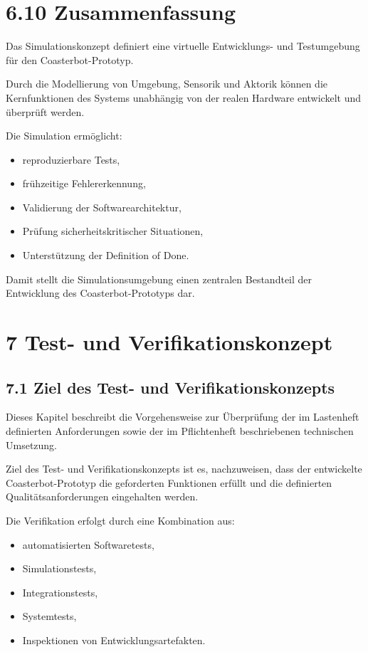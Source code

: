 \documentclass[
  a4paper,
  12pt,
  DIV=12,        %
  parskip=half,  %
  headings=small %
]{scrartcl}
\theoremstyle{definition}
\providecommand{\tightlist}{%
  \setlength{\itemsep}{0pt}\setlength{\parskip}{0pt}}
\theoremstyle{definition}
\providecommand{\tightlist}{%
  \setlength{\itemsep}{0pt}\setlength{\parskip}{0pt}}
\begin{document}
\section{6.10 Zusammenfassung}\label{zusammenfassung-4}

Das Simulationskonzept definiert eine virtuelle Entwicklungs- und
Testumgebung für den Coasterbot-Prototyp.

Durch die Modellierung von Umgebung, Sensorik und Aktorik können die
Kernfunktionen des Systems unabhängig von der realen Hardware entwickelt
und überprüft werden.

Die Simulation ermöglicht:

\begin{itemize}
\tightlist
\item
  reproduzierbare Tests,
\item
  frühzeitige Fehlererkennung,
\item
  Validierung der Softwarearchitektur,
\item
  Prüfung sicherheitskritischer Situationen,
\item
  Unterstützung der Definition of Done.
\end{itemize}

Damit stellt die Simulationsumgebung einen zentralen Bestandteil der
Entwicklung des Coasterbot-Prototyps dar.

\section{7 Test- und
Verifikationskonzept}\label{test--und-verifikationskonzept}

\subsection{7.1 Ziel des Test- und
Verifikationskonzepts}\label{ziel-des-test--und-verifikationskonzepts}

Dieses Kapitel beschreibt die Vorgehensweise zur Überprüfung der im
Lastenheft definierten Anforderungen sowie der im Pflichtenheft
beschriebenen technischen Umsetzung.

Ziel des Test- und Verifikationskonzepts ist es, nachzuweisen, dass der
entwickelte Coasterbot-Prototyp die geforderten Funktionen erfüllt und
die definierten Qualitätsanforderungen eingehalten werden.

Die Verifikation erfolgt durch eine Kombination aus:

\begin{itemize}
\tightlist
\item
  automatisierten Softwaretests,
\item
  Simulationstests,
\item
  Integrationstests,
\item
  Systemtests,
\item
  Inspektionen von Entwicklungsartefakten.
\end{itemize}
\end{document}

